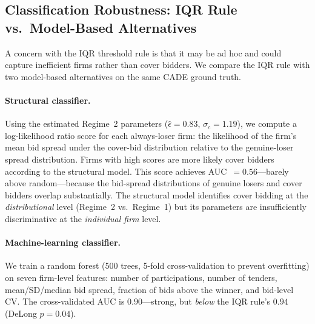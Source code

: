 
\subsection{Classification Robustness: IQR Rule vs.\ Model-Based Alternatives} %
\label{sec:classification_robustness}

A concern with the IQR threshold rule is that it may be ad hoc and
could capture inefficient firms rather than cover bidders. We compare
the IQR rule with two model-based alternatives on the same CADE
ground truth.

\paragraph{Structural classifier.}
Using the estimated Regime~2 parameters ($\hat{\epsilon} = 0.83$,
$\hat{\sigma}_c = 1.19$), we compute a log-likelihood ratio score for
each always-loser firm: the likelihood of the firm's mean bid spread
under the cover-bid distribution relative to the genuine-loser spread
distribution. Firms with high scores are more likely cover bidders
according to the structural model. This score achieves
AUC~$= 0.56$---barely above random---because the bid-spread
distributions of genuine losers and cover bidders overlap
substantially. The structural model identifies cover bidding at the
\emph{distributional} level (Regime~2 vs.\ Regime~1) but its
parameters are insufficiently discriminative at the \emph{individual
firm} level.

\paragraph{Machine-learning classifier.}
We train a random forest (500 trees, 5-fold cross-validation to
prevent overfitting) on seven firm-level features: number of
participations, number of tenders, mean/SD/median bid spread,
fraction of bids above the winner, and bid-level CV. The
cross-validated AUC is $0.90$---strong, but \emph{below} the IQR
rule's $0.94$ (DeLong $p = 0.04$).

